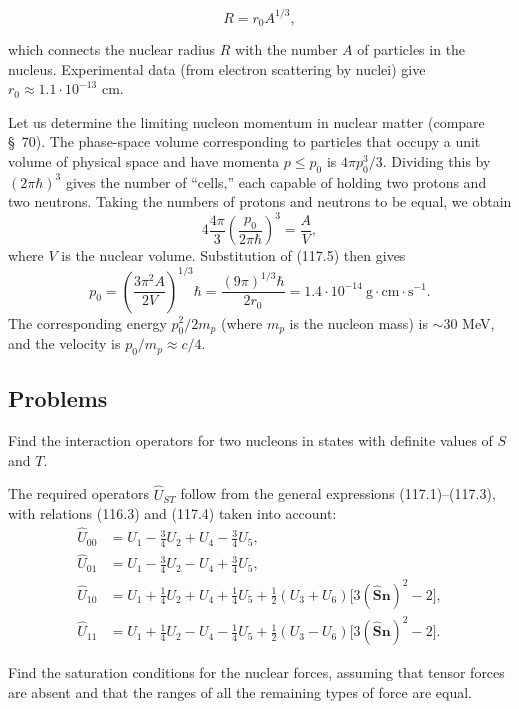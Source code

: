 
\begin{equation}
 R=r_0A^{1/3},
 \tag{117.5}
\end{equation}

which connects the nuclear radius $R$ with the number $A$ of particles in the
nucleus. Experimental data (from electron scattering by nuclei) give
$r_0\approx1{.}1\cdot10^{-13}$ cm.

Let us determine the limiting nucleon momentum in nuclear matter (compare
§~70). The phase-space volume corresponding to particles that occupy a unit
volume of physical space and have momenta $p\leqslant p_0$ is $4\pi p_0^3/3$.
Dividing this by $(2\pi\hbar)^3$ gives the number of ``cells,'' each capable of
holding two protons and two neutrons. Taking the numbers of protons and
neutrons to be equal, we obtain
\[
 4\frac{4\pi}{3}\left(\frac{p_0}{2\pi\hbar}\right)^3=\frac AV,
\]
where $V$ is the nuclear volume. Substitution of (117.5) then gives
\[
 p_0=\left(\frac{3\pi^2A}{2V}\right)^{1/3}\hbar
 =\frac{(9\pi)^{1/3}\hbar}{2r_0}
 =1{.}4\cdot10^{-14}\ \text{g}\cdot\text{cm}\cdot\text{s}^{-1}.
\]
The corresponding energy $p_0^2/2m_p$ (where $m_p$ is the nucleon mass) is
$\sim30$ MeV, and the velocity is $p_0/m_p\approx c/4$.

\subsection*{Problems}

 Find the interaction operators for two nucleons in states
with definite values of $S$ and $T$.

\SolutionHeading The required operators $\hat U_{ST}$ follow from the general
expressions (117.1)--(117.3), with relations (116.3) and (117.4) taken into
account:
\begin{align*}
 \hat U_{00}&=U_1-\frac34U_2+U_4-\frac34U_5,\\
 \hat U_{01}&=U_1-\frac34U_2-U_4+\frac34U_5,\\
 \hat U_{10}&=U_1+\frac14U_2+U_4+\frac14U_5
 +\frac12(U_3+U_6)\bigl[3(\hat{\mathbf S}\mathbf n)^2-2\bigr],\\
 \hat U_{11}&=U_1+\frac14U_2-U_4-\frac14U_5
 +\frac12(U_3-U_6)\bigl[3(\hat{\mathbf S}\mathbf n)^2-2\bigr].
\end{align*}

 Find the saturation conditions for the nuclear forces,
assuming that tensor forces are absent and that the ranges of all the remaining
types of force are equal.

